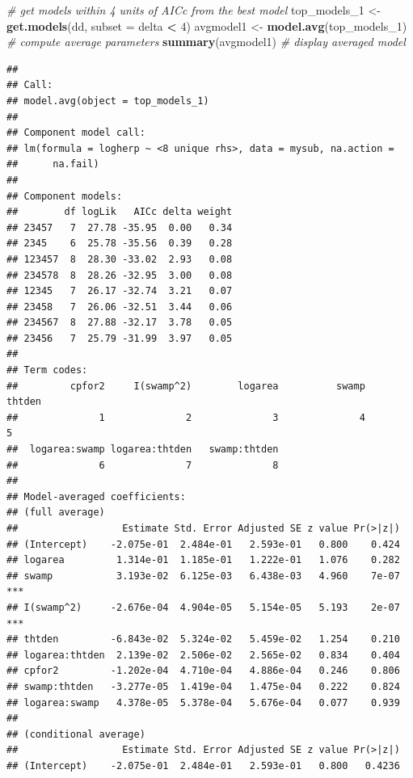 \documentclass[
  12pt,
]{book}
\newenvironment{Shaded}{\begin{snugshade}}{\end{snugshade}}
\newcommand{\CommentTok}[1]{\textcolor[rgb]{0.56,0.35,0.01}{\textit{#1}}}
\newcommand{\DataTypeTok}[1]{\textcolor[rgb]{0.13,0.29,0.53}{#1}}
\newcommand{\DecValTok}[1]{\textcolor[rgb]{0.00,0.00,0.81}{#1}}
\newcommand{\KeywordTok}[1]{\textcolor[rgb]{0.13,0.29,0.53}{\textbf{#1}}}
\newcommand{\NormalTok}[1]{#1}
\newcommand{\OperatorTok}[1]{\textcolor[rgb]{0.81,0.36,0.00}{\textbf{#1}}}
\newcommand{\StringTok}[1]{\textcolor[rgb]{0.31,0.60,0.02}{#1}}
\begin{document}
\begin{Shaded}
\begin{Highlighting}[]
\CommentTok{\# get models within 4 units of AICc from the best model}
\NormalTok{top\_models\_}\DecValTok{1}\NormalTok{ \textless{}{-}}\StringTok{ }\KeywordTok{get.models}\NormalTok{(dd, }\DataTypeTok{subset =}\NormalTok{ delta }\OperatorTok{\textless{}}\StringTok{ }\DecValTok{4}\NormalTok{)}
\NormalTok{avgmodel1 \textless{}{-}}\StringTok{ }\KeywordTok{model.avg}\NormalTok{(top\_models\_}\DecValTok{1}\NormalTok{) }\CommentTok{\# compute average parameters}
\KeywordTok{summary}\NormalTok{(avgmodel1) }\CommentTok{\# display averaged model}
\end{Highlighting}
\end{Shaded}

\begin{verbatim}
## 
## Call:
## model.avg(object = top_models_1)
## 
## Component model call: 
## lm(formula = logherp ~ <8 unique rhs>, data = mysub, na.action = 
##      na.fail)
## 
## Component models: 
##        df logLik   AICc delta weight
## 23457   7  27.78 -35.95  0.00   0.34
## 2345    6  25.78 -35.56  0.39   0.28
## 123457  8  28.30 -33.02  2.93   0.08
## 234578  8  28.26 -32.95  3.00   0.08
## 12345   7  26.17 -32.74  3.21   0.07
## 23458   7  26.06 -32.51  3.44   0.06
## 234567  8  27.88 -32.17  3.78   0.05
## 23456   7  25.79 -31.99  3.97   0.05
## 
## Term codes: 
##         cpfor2     I(swamp^2)        logarea          swamp         thtden 
##              1              2              3              4              5 
##  logarea:swamp logarea:thtden   swamp:thtden 
##              6              7              8 
## 
## Model-averaged coefficients:  
## (full average) 
##                  Estimate Std. Error Adjusted SE z value Pr(>|z|)    
## (Intercept)    -2.075e-01  2.484e-01   2.593e-01   0.800    0.424    
## logarea         1.314e-01  1.185e-01   1.222e-01   1.076    0.282    
## swamp           3.193e-02  6.125e-03   6.438e-03   4.960    7e-07 ***
## I(swamp^2)     -2.676e-04  4.904e-05   5.154e-05   5.193    2e-07 ***
## thtden         -6.843e-02  5.324e-02   5.459e-02   1.254    0.210    
## logarea:thtden  2.139e-02  2.506e-02   2.565e-02   0.834    0.404    
## cpfor2         -1.202e-04  4.710e-04   4.886e-04   0.246    0.806    
## swamp:thtden   -3.277e-05  1.419e-04   1.475e-04   0.222    0.824    
## logarea:swamp   4.378e-05  5.378e-04   5.676e-04   0.077    0.939    
##  
## (conditional average) 
##                  Estimate Std. Error Adjusted SE z value Pr(>|z|)    
## (Intercept)    -2.075e-01  2.484e-01   2.593e-01   0.800   0.4236    

\end{verbatim}
\end{document}
